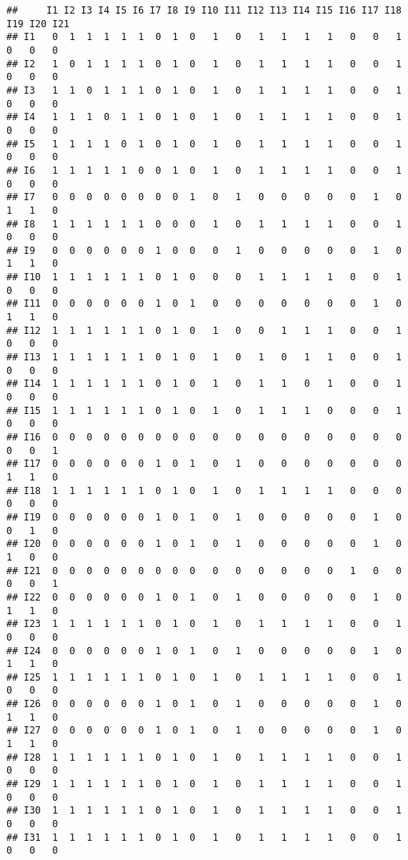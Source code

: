 \documentclass[
]{article}
\begin{document}
\begin{verbatim}
##     I1 I2 I3 I4 I5 I6 I7 I8 I9 I10 I11 I12 I13 I14 I15 I16 I17 I18 I19 I20 I21
## I1   0  1  1  1  1  1  0  1  0   1   0   1   1   1   1   0   0   1   0   0   0
## I2   1  0  1  1  1  1  0  1  0   1   0   1   1   1   1   0   0   1   0   0   0
## I3   1  1  0  1  1  1  0  1  0   1   0   1   1   1   1   0   0   1   0   0   0
## I4   1  1  1  0  1  1  0  1  0   1   0   1   1   1   1   0   0   1   0   0   0
## I5   1  1  1  1  0  1  0  1  0   1   0   1   1   1   1   0   0   1   0   0   0
## I6   1  1  1  1  1  0  0  1  0   1   0   1   1   1   1   0   0   1   0   0   0
## I7   0  0  0  0  0  0  0  0  1   0   1   0   0   0   0   0   1   0   1   1   0
## I8   1  1  1  1  1  1  0  0  0   1   0   1   1   1   1   0   0   1   0   0   0
## I9   0  0  0  0  0  0  1  0  0   0   1   0   0   0   0   0   1   0   1   1   0
## I10  1  1  1  1  1  1  0  1  0   0   0   1   1   1   1   0   0   1   0   0   0
## I11  0  0  0  0  0  0  1  0  1   0   0   0   0   0   0   0   1   0   1   1   0
## I12  1  1  1  1  1  1  0  1  0   1   0   0   1   1   1   0   0   1   0   0   0
## I13  1  1  1  1  1  1  0  1  0   1   0   1   0   1   1   0   0   1   0   0   0
## I14  1  1  1  1  1  1  0  1  0   1   0   1   1   0   1   0   0   1   0   0   0
## I15  1  1  1  1  1  1  0  1  0   1   0   1   1   1   0   0   0   1   0   0   0
## I16  0  0  0  0  0  0  0  0  0   0   0   0   0   0   0   0   0   0   0   0   1
## I17  0  0  0  0  0  0  1  0  1   0   1   0   0   0   0   0   0   0   1   1   0
## I18  1  1  1  1  1  1  0  1  0   1   0   1   1   1   1   0   0   0   0   0   0
## I19  0  0  0  0  0  0  1  0  1   0   1   0   0   0   0   0   1   0   0   1   0
## I20  0  0  0  0  0  0  1  0  1   0   1   0   0   0   0   0   1   0   1   0   0
## I21  0  0  0  0  0  0  0  0  0   0   0   0   0   0   0   1   0   0   0   0   1
## I22  0  0  0  0  0  0  1  0  1   0   1   0   0   0   0   0   1   0   1   1   0
## I23  1  1  1  1  1  1  0  1  0   1   0   1   1   1   1   0   0   1   0   0   0
## I24  0  0  0  0  0  0  1  0  1   0   1   0   0   0   0   0   1   0   1   1   0
## I25  1  1  1  1  1  1  0  1  0   1   0   1   1   1   1   0   0   1   0   0   0
## I26  0  0  0  0  0  0  1  0  1   0   1   0   0   0   0   0   1   0   1   1   0
## I27  0  0  0  0  0  0  1  0  1   0   1   0   0   0   0   0   1   0   1   1   0
## I28  1  1  1  1  1  1  0  1  0   1   0   1   1   1   1   0   0   1   0   0   0
## I29  1  1  1  1  1  1  0  1  0   1   0   1   1   1   1   0   0   1   0   0   0
## I30  1  1  1  1  1  1  0  1  0   1   0   1   1   1   1   0   0   1   0   0   0
## I31  1  1  1  1  1  1  0  1  0   1   0   1   1   1   1   0   0   1   0   0   0

\end{verbatim}
\end{document}
